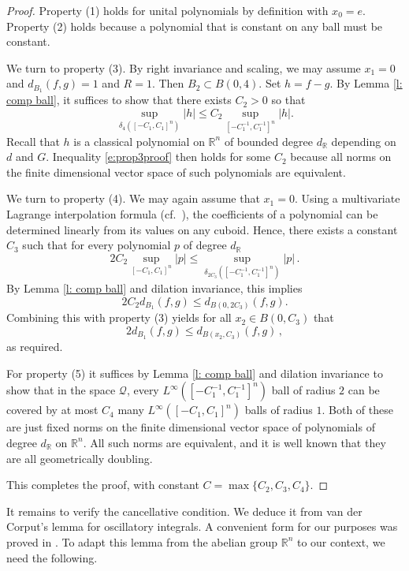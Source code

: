 \documentclass[12pt,reqno,a4paper,dvipsnames]{amsart}
\theoremstyle{plain}
\theoremstyle{definition}
\numberwithin{theorem}{section}
\numberwithin{equation}{section}
\newcommand{\R}{\mathbb{R}}
\begin{document}
\begin{proof} 
    Property (1) holds for unital polynomials by definition with $x_0 = e$. Property (2) holds because a polynomial that is constant on any ball must be constant.

    We turn to property (3). By right invariance and scaling, we may assume $x_1=0$ and $d_{B_1}(f,g)=1$ and $R = 1$. Then $B_2 \subset B(0, 4)$. 
    Set $h=f-g$. By Lemma \ref{l: comp ball}, it suffices to show that there exists $C_2 > 0$ so that
    \begin{equation}\label{e:prop3proof}
        \sup_{\delta_{4}([-C_1, C_1]^n)} |h| \le C_2 \sup_{[-C_1^{-1}, C_1^{-1}]^n} |h|.
    \end{equation}
        Recall that $h$ is a classical polynomial on $\mathbb{R}^n$ of bounded degree $d_\R$ depending on $d$ and $G$. Inequality \eqref{e:prop3proof} then holds for some $C_2$ because all norms on the finite dimensional vector space of such polynomials are equivalent.

    We turn to property (4). We may again assume that $x_1 = 0$. Using a multivariate Lagrange interpolation formula (cf.~\cite[Theorem~3.1]{nicolaides1972class}), the coefficients of a polynomial can be determined linearly from its values on any cuboid. Hence, there exists a constant $C_3$ such that for every polynomial $p$ of degree $d_\R$ 
    \[
        2C_2 \sup_{[-C_1, C_1]^n} |p| \le  \sup_{\delta_{2C_3}( [-C_1^{-1}, C_1^{-1}]^n)} |p|\,.
    \]
    By Lemma \ref{l: comp ball} and dilation invariance, this implies
    \[
        2C_2 d_{B_1}(f,g) \le d_{B(0, 2C_3)}(f,g).
    \]
    Combining this with property (3) yields for all $x_2 \in B(0, C_3)$ that
    \[
        2 d_{B_1}(f,g) \le d_{B(x_2, C_3)}(f,g)\,,
    \]
    as required.

    For property (5) it suffices by Lemma \ref{l: comp ball} and dilation invariance to show that in the space $\mathcal{Q}$, every
    $L^\infty([-C_1^{-1}, C_1^{-1}]^n)$ ball of radius $2$ can be covered by at most $C_4$ many 
    $L^\infty([-C_1, C_1]^n)$
    balls of radius $1$. Both of these are just fixed norms on the finite dimensional vector space of polynomials of degree $d_\R$ on $\R^n$. All such norms are equivalent, and it is well known that they are all geometrically doubling.

    This completes the proof, with constant $C = \max\{C_2, C_3, C_4\}$.
\end{proof}

It remains to verify the cancellative condition. We deduce it from van der Corput's lemma for oscillatory integrals. A convenient form for our purposes was proved in \cite[Lemma~A.1]{zk-polynomial}. To adapt this lemma from the abelian group $\R^n$ to our context, we need the following.
\end{document}
